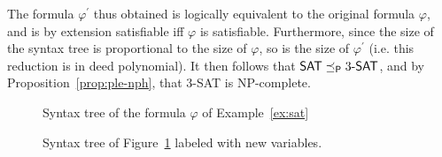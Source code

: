 \begin{example}
    The formula \(\varphi^\prime\) thus obtained is logically equivalent to the original formula \(\varphi\), and is by extension satisfiable iff \(\varphi\) is satisfiable. Furthermore, since the size of the syntax tree is proportional to the size of \(\varphi\), so is the size of \(\varphi^\prime\) (i.e. this reduction is in deed polynomial). It then follows that 
    \(\textsf{SAT} \preceq_\textsf{P} 3\textsf{-SAT}\), and by Proposition~\ref{prop:ple-nph}, that 3-\textsf{SAT} is \textsf{NP}-complete.
    \begin{figure}
        \begin{center}
        \end{center}
        \caption{Syntax tree of the formula \(\varphi\) of Example~\ref{ex:sat}}
        \label{fig:3sat-npc-syntax-tree}
    \end{figure}

    \begin{figure}
        \begin{center}
        \end{center}
        \caption{Syntax tree of Figure~\ref{fig:3sat-npc-syntax-tree} labeled with new variables.}
        \label{fig:3sat-npc-var-tree}
    \end{figure}
\end{example}

